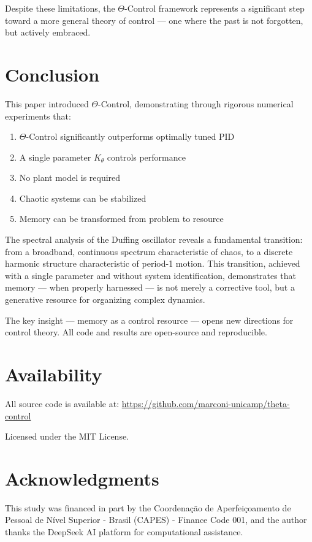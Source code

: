 \documentclass[12pt,a4paper]{article}
\begin{document}
Despite these limitations, the $\Theta$-Control framework 
represents a significant step toward a more general theory of 
control — one where the past is not forgotten, but actively 
embraced.

\section{Conclusion}

This paper introduced $\Theta$-Control, demonstrating through 
rigorous numerical experiments that:

\begin{enumerate}
    \item $\Theta$-Control significantly outperforms optimally tuned PID
    \item A single parameter $K_\theta$ controls performance
    \item No plant model is required
    \item Chaotic systems can be stabilized
    \item Memory can be transformed from problem to resource
\end{enumerate}

The spectral analysis of the Duffing oscillator reveals a fundamental transition: 
from a broadband, continuous spectrum characteristic of chaos, to a discrete 
harmonic structure characteristic of period-1 motion. This transition, achieved 
with a single parameter and without system identification, demonstrates that 
memory — when properly harnessed — is not merely a corrective tool, but a 
generative resource for organizing complex dynamics.

The key insight — memory as a control resource — opens 
new directions for control theory. All code and results are 
open-source and reproducible.


\section*{Availability}

All source code is available at:
\url{https://github.com/marconi-unicamp/theta-control}

Licensed under the MIT License.

\section*{Acknowledgments}
This study was financed in part by the Coordenação de Aperfeiçoamento de Pessoal de Nível Superior - Brasil (CAPES) - Finance Code 001, and the author thanks the DeepSeek AI platform for computational assistance.



\end{document}

